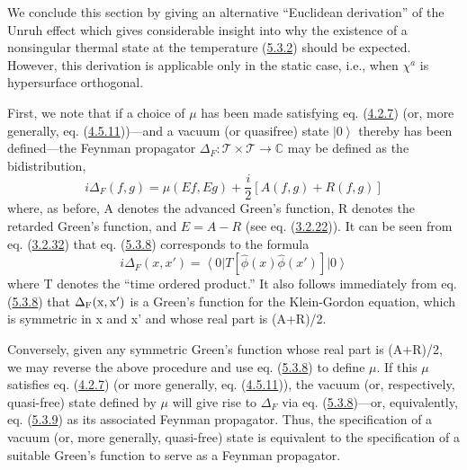 \documentclass[11pt,a4paper]{article}
\providecommand{\ket}[1]{\left\lvert#1\right\rangle}
\providecommand{\bra}[1]{\left\langle#1\right\rvert}
\begin{document}
We conclude this section by giving an alternative ``Euclidean derivation'' of the Unruh effect which gives considerable insight into why the existence of a nonsingular thermal state at the temperature \hypertarget{source-143}{} (\hyperref[eq:5.3.2]{5.3.2}) should be expected. However, this derivation is applicable only in the static case, i.e., when \(\chi^a\) is hypersurface orthogonal.

First, we note that if a choice of \(\mu\) has been made satisfying eq. (\hyperref[eq:4.2.7]{4.2.7}) (or, more generally, eq. (\hyperref[eq:4.5.11]{4.5.11}))---and a vacuum (or quasifree) state \(\ket0\) thereby has been defined---the Feynman propagator \(\Delta_{F}: \mathcal{T} \times \mathcal{T} \to \mathbb{C}\) may be defined as the bidistribution,
\begin{equation*}
i\Delta_{F}(f,g) = \mu(Ef,Eg) + \frac{i}{2} [A(f,g) + R(f,g)] \tag{5.3.8}\label{eq:5.3.8}
\end{equation*}
where, as before, A denotes the advanced Green's function, R denotes the retarded Green's function, and \(E=A-R\) (see eq. (\hyperref[eq:3.2.22]{3.2.22})). It can be seen from eq. (\hyperref[eq:3.2.32]{3.2.32}) that eq. (\hyperref[eq:5.3.8]{5.3.8}) corresponds to the formula
\begin{equation*}
i\Delta_{F}(x,x') = \bra{0} T[\hat{\phi}(x)\hat{\phi}(x')] \ket{0} \tag{5.3.9}\label{eq:5.3.9}
\end{equation*}
where T denotes the ``time ordered product.'' It also follows immediately from eq. (\hyperref[eq:5.3.8]{5.3.8}) that \(\Delta_{\rm F}({\rm x},{\rm x}')\) is a Green's function for the Klein-Gordon equation, which is symmetric in x and x' and whose real part is (A+R)/2.

Conversely, given any symmetric Green's function whose real part is (A+R)/2, we may reverse the above procedure and use eq. (\hyperref[eq:5.3.8]{5.3.8}) to define \(\mu\). If this \(\mu\) satisfies eq. (\hyperref[eq:4.2.7]{4.2.7}) (or more generally, eq. (\hyperref[eq:4.5.11]{4.5.11})), the vacuum (or, respectively, quasi-free) state defined by \(\mu\) will give rise to \(\Delta_F\) via eq. (\hyperref[eq:5.3.8]{5.3.8})---or, equivalently, eq. (\hyperref[eq:5.3.9]{5.3.9}) as its associated Feynman propagator. Thus, the specification of a vacuum (or, more generally, quasi-free) state is equivalent to the specification of a suitable Green's function to serve as a Feynman propagator.
\end{document}
